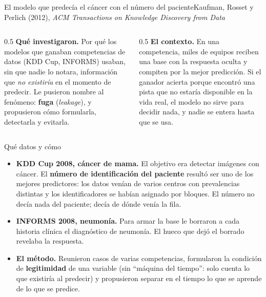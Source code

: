 \documentclass{beamer}
\begin{document}
\begin{frame}{El modelo que predecía el cáncer con el número del paciente}{Kaufman, Rosset y Perlich (2012), \emph{ACM Transactions on Knowledge Discovery from Data}}
\begin{columns}[T]
\begin{column}{0.5\textwidth}
\textbf{Qué investigaron.} Por qué los modelos que ganaban competencias de datos (KDD Cup, INFORMS) usaban, sin que nadie lo notara, información que \emph{no existiría} en el momento de predecir. Le pusieron nombre al fenómeno: \textbf{fuga} (\emph{leakage}), y propusieron cómo formularla, detectarla y evitarla.
\end{column}
\begin{column}{0.5\textwidth}
\textbf{El contexto.} En una competencia, miles de equipos reciben una base con la respuesta oculta y compiten por la mejor predicción. Si el ganador acierta porque encontró una pista que no estaría disponible en la vida real, el modelo no sirve para decidir nada, y nadie se entera hasta que se usa.
\end{column}
\end{columns}
\end{frame}

\begin{frame}{Qué datos y cómo}
\small
\begin{itemize}\itemsep5pt
  \item \textbf{KDD Cup 2008, cáncer de mama.} El objetivo era detectar imágenes con cáncer. El \textbf{número de identificación del paciente} resultó ser uno de los mejores predictores: los datos venían de varios centros con prevalencias distintas y los identificadores se habían asignado por bloques. El número no decía nada del paciente; decía de dónde venía la fila.
  \item \textbf{INFORMS 2008, neumonía.} Para armar la base le borraron a cada historia clínica el diagnóstico de neumonía. El hueco que dejó el borrado revelaba la respuesta.
  \item \textbf{El método.} Reunieron casos de varias competencias, formularon la condición de \textbf{legitimidad} de una variable (sin ``máquina del tiempo'': solo cuenta lo que existiría al predecir) y propusieron separar en el tiempo lo que se aprende de lo que se predice.
\end{itemize}
\end{frame}
\end{document}
